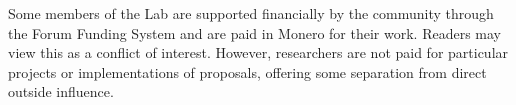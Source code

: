 \documentclass[12pt,english]{mrl}
\theoremstyle{definition}
\numberwithin{equation}{section}
\numberwithin{figure}{section}
\numberwithin{equation}{section}
\numberwithin{equation}{section}
\numberwithin{figure}{section}
\begin{document}
Some members of the Lab are supported financially by the community through the Forum Funding System and are paid in Monero for their work. Readers may view this as a conflict of interest. However, researchers are not paid for particular projects or implementations of proposals, offering some separation from direct outside influence.


\medskip{}



\end{document}

